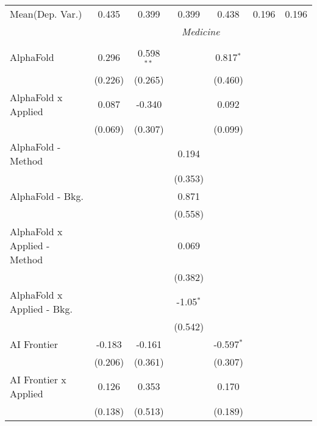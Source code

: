 \begin{tabular}{lcccccc}
Mean(Dep. Var.) & 0.435 & 0.399 & 0.399 & 0.438 & 0.196 & 0.196 \\
 & \multicolumn{6}{c}{\textit{Medicine}} \\ \\
   AlphaFold                      & 0.296         & 0.598$^{**}$ &              & 0.817$^{*}$   &        &   \\   
                                  & (0.226)       & (0.265)      &              & (0.460)       &        &   \\   
   AlphaFold x Applied            & 0.087         & -0.340       &              & 0.092         &        &   \\   
                                  & (0.069)       & (0.307)      &              & (0.099)       &        &   \\   
   AlphaFold - Method             &               &              & 0.194        &               &        &   \\   
                                  &               &              & (0.353)      &               &        &   \\   
   AlphaFold - Bkg.               &               &              & 0.871        &               &        &   \\   
                                  &               &              & (0.558)      &               &        &   \\   
   AlphaFold x Applied - Method   &               &              & 0.069        &               &        &   \\   
                                  &               &              & (0.382)      &               &        &   \\   
   AlphaFold x Applied - Bkg.     &               &              & -1.05$^{*}$  &               &        &   \\   
                                  &               &              & (0.542)      &               &        &   \\   
   AI Frontier                    & -0.183        & -0.161       &              & -0.597$^{*}$  &        &   \\   
                                  & (0.206)       & (0.361)      &              & (0.307)       &        &   \\   
   AI Frontier x Applied          & 0.126         & 0.353        &              & 0.170         &        &   \\   
                                  & (0.138)       & (0.513)      &              & (0.189)       &        &   \\   

\end{tabular}
